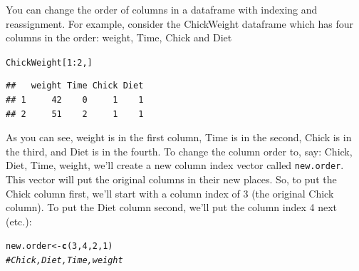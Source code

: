 \documentclass{tufte-book}\usepackage[]{graphicx}\usepackage[]{color}
\makeatletter
\newcommand{\hlnum}[1]{\textcolor[rgb]{0.686,0.059,0.569}{#1}}%
\newcommand{\hlcom}[1]{\textcolor[rgb]{0.678,0.584,0.686}{\textit{#1}}}%
\newcommand{\hlopt}[1]{\textcolor[rgb]{0,0,0}{#1}}%
\newcommand{\hlstd}[1]{\textcolor[rgb]{0.345,0.345,0.345}{#1}}%
\newcommand{\hlkwb}[1]{\textcolor[rgb]{0.69,0.353,0.396}{#1}}%
\newcommand{\hlkwd}[1]{\textcolor[rgb]{0.737,0.353,0.396}{\textbf{#1}}}%
\newenvironment{kframe}{%
 \def\at@end@of@kframe{}%
 \ifinner\ifhmode%
  \def\at@end@of@kframe{\end{minipage}}%
  \begin{minipage}{\columnwidth}%
 \fi\fi%
 \def\FrameCommand##1{\hskip\@totalleftmargin \hskip-\fboxsep
 \colorbox{shadecolor}{##1}\hskip-\fboxsep
     \hskip-\linewidth \hskip-\@totalleftmargin \hskip\columnwidth}%
 \MakeFramed {\advance\hsize-\width
   \@totalleftmargin\z@ \linewidth\hsize
   \@setminipage}}%
 {\par\unskip\endMakeFramed%
 \at@end@of@kframe}
\newenvironment{knitrout}{}{} %
\makeatother
\begin{document}
You can change the order of columns in a dataframe with indexing and reassignment. For example, consider the ChickWeight dataframe which has four columns in the order: weight, Time, Chick and Diet

\begin{knitrout}
\color{fgcolor}\begin{kframe}
\begin{alltt}
\hlstd{ChickWeight[}\hlnum{1}\hlopt{:}\hlnum{2}\hlstd{,]}
\end{alltt}
\begin{verbatim}
##   weight Time Chick Diet
## 1     42    0     1    1
## 2     51    2     1    1
\end{verbatim}
\end{kframe}
\end{knitrout}

As you can see, weight is in the first column, Time is in the second, Chick is in the third, and Diet is in the fourth. To change the column order to, say: Chick, Diet, Time, weight, we'll create a new column index vector called \texttt{new.order}. This vector will put the original columns in their new places. So, to put the Chick column first, we'll start with a column index of 3 (the original Chick column). To put the Diet column second, we'll put the column index 4 next (etc.):

\begin{knitrout}
\color{fgcolor}\begin{kframe}
\begin{alltt}
\hlstd{new.order} \hlkwb{<-} \hlkwd{c}\hlstd{(}\hlnum{3}\hlstd{,} \hlnum{4}\hlstd{,} \hlnum{2}\hlstd{,} \hlnum{1}\hlstd{)}
\hlcom{# Chick, Diet, Time, weight}
\end{alltt}
\end{kframe}
\end{knitrout}
\end{document}
